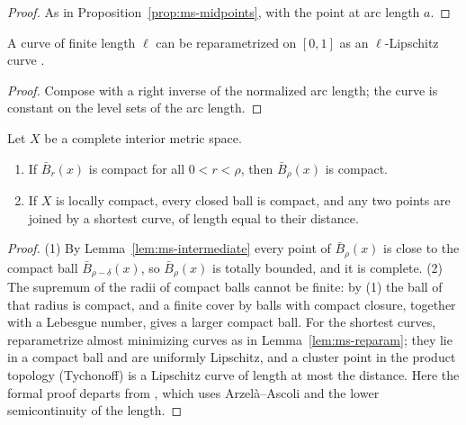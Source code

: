\begin{proof}
  \leanok
  As in Proposition~\ref{prop:ms-midpoints}, with the point at arc length $a$.
\end{proof}

\begin{lemma}
  \label{lem:ms-reparam}
  \leanok
  A curve of finite length $\ell$ can be reparametrized on $[0, 1]$ as an $\ell$-Lipschitz curve
  \cite[Obs.~8.1.5, Cor.~8.1.6]{Lar26}.
\end{lemma}

\begin{proof}
  \leanok
  Compose with a right inverse of the normalized arc length; the curve is constant on the level
  sets of the arc length.
\end{proof}

\begin{theorem}
  \label{thm:ms-hopf-rinow}
  \leanok
  Let $X$ be a complete interior metric space.
  \begin{enumerate}
    \item If $\bar B_r(x)$ is compact for all $0 < r < \rho$, then $\bar B_\rho(x)$ is compact.
    \item If $X$ is locally compact, every closed ball is compact, and any two points are joined
      by a shortest curve, of length equal to their distance.
  \end{enumerate}
\end{theorem}

\begin{proof}
  \leanok
  (1) By Lemma~\ref{lem:ms-intermediate} every point of $\bar B_\rho(x)$ is close to the compact
  ball $\bar B_{\rho - \delta}(x)$, so $\bar B_\rho(x)$ is totally bounded, and it is complete.
  (2) The supremum of the radii of compact balls cannot be finite: by (1) the ball of that radius
  is compact, and a finite cover by balls with compact closure, together with a Lebesgue number,
  gives a larger compact ball. For the shortest curves, reparametrize almost minimizing curves as
  in Lemma~\ref{lem:ms-reparam}; they lie in a compact ball and are uniformly Lipschitz, and a
  cluster point in the product topology (Tychonoff) is a Lipschitz curve of length at most the
  distance. Here the formal proof departs from \cite{Lar26}, which uses Arzelà--Ascoli and the
  lower semicontinuity of the length.
\end{proof}

